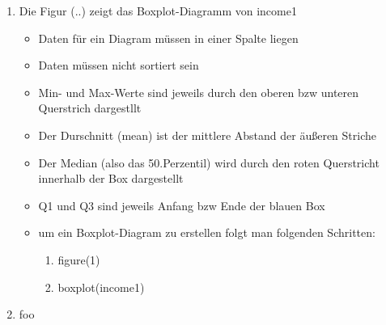 \begin{enumerate}
	\item Die Figur (..) zeigt das Boxplot-Diagramm von income1 
	\begin{itemize}
		\item Daten für ein Diagram müssen in einer Spalte liegen
		\item Daten müssen nicht sortiert sein
		\item Min- und Max-Werte sind jeweils durch den oberen bzw unteren Querstrich dargestllt
		\item Der Durschnitt (mean) ist der mittlere Abstand der äußeren  Striche
		\item Der Median (also das 50.Perzentil) wird durch den roten Querstricht innerhalb der Box dargestellt
		\item Q1 und Q3 sind jeweils Anfang bzw Ende der blauen Box
		\item um ein Boxplot-Diagram zu erstellen folgt man folgenden Schritten:
		\begin{enumerate}
			\item figure(1)
			\item boxplot(income1)
		\end{enumerate}
	\end{itemize}
	\item foo 

\end{enumerate}
